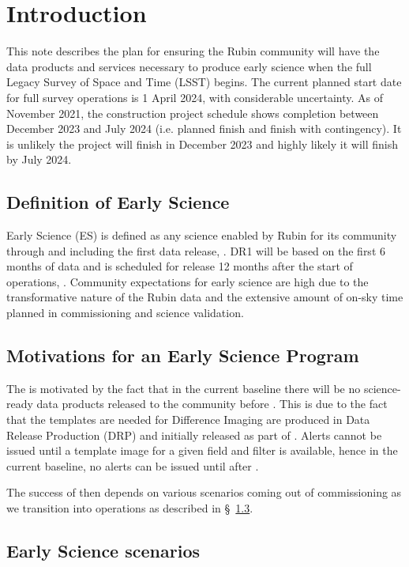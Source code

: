 \section{Introduction}

This  note describes the plan for ensuring the Rubin community will have the data products and services necessary to produce early science when the full Legacy Survey of Space and Time (LSST)  begins. 
The current planned start date for full survey operations is 1 April 2024, with considerable uncertainty. 
As of November 2021, the construction project schedule shows completion between December 2023 and July 2024 (i.e. planned finish and finish with contingency). 
It is unlikely the project will finish in December 2023 and highly likely it will finish by July 2024. 

\subsection{Definition of Early Science}  \label{ssec:defn}

Early Science (ES) is defined as any science enabled by Rubin for its community through and including the first data release, \drone.
DR1 will be based on the first 6 months of data and is scheduled for release 12 months after the start of operations, \citep{RDO-011}.
Community expectations for early science are high due to the transformative nature of the Rubin data and the extensive amount of on-sky time planned in commissioning and science validation.

\subsection{Motivations for an Early Science Program}

The \esp is motivated by the fact that in the current baseline there will be no science-ready data products released to the community before \drone.
This is due to the fact that the templates are needed for Difference Imaging are produced in Data Release Production (DRP) and initially released as part of \drone. 
Alerts cannot be issued until a template image for a given field and filter is available, hence  in the current baseline, no alerts can be issued until after \drone.

The success of \es then depends on various scenarios coming out of commissioning as we transition into operations as described in \S~\ref{ssec:scenarios}. 

\subsection{Early Science scenarios } \label{ssec:scenarios}

